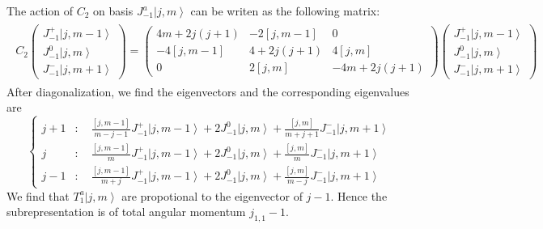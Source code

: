 \documentclass[10pt,a4paper]{article}
\numberwithin{equation}{section}
\newcommand{\ket}[1]{\left| #1 \right\rangle}
\begin{document}
The action of $C_{2}$ on basis $J^{a}_{-1} \ket{j,m}$ can be writen as the following matrix:
\begin{eqnarray}
    \begin{aligned}
        C_{2} 
    \begin{pmatrix}
    J^{+}_{-1} \ket{j,m-1}\\
    J^{0}_{-1} \ket{j,m}\\
    J^{-}_{-1} \ket{j,m+1}
    \end{pmatrix}
    = \begin{pmatrix}
        4m+2j(j+1) & -2 [j,m-1] & 0\\
        -4 [j,m-1] & 4 + 2j(j+1) & 4[j,m]\\
        0 & 2 [j,m] & -4m + 2j(j+1)
    \end{pmatrix}
    \begin{pmatrix}
        J^{+}_{-1} \ket{j,m-1}\\
        J^{0}_{-1} \ket{j,m}\\
        J^{-}_{-1} \ket{j,m+1}
    \end{pmatrix}
    \end{aligned}
\end{eqnarray}
After diagonalization, we find the eigenvectors and the corresponding eigenvalues are 
\begin{equation}
    \left\{
        \begin{aligned}
            j+1 &: \quad \frac{[j,m-1]}{m-j-1} J^{+}_{-1} \ket{j,m-1} + 2 J^{0}_{-1} \ket{j,m} + \frac{[j,m]}{m+j+1} J^{-}_{-1} \ket{j,m+1}\\
            j &: \quad \frac{[j,m-1]}{m} J^{+}_{-1} \ket{j,m-1} + 2 J^{0}_{-1} \ket{j,m} + \frac{[j,m]}{m} J^{-}_{-1} \ket{j,m+1}\\
            j-1 &: \quad \frac{[j,m-1]}{m+j} J^{+}_{-1} \ket{j,m-1} + 2 J^{0}_{-1} \ket{j,m} + \frac{[j,m]}{m-j} J^{-}_{-1} \ket{j,m+1}
        \end{aligned}
    \right.
\end{equation}
We find that $T^{a}_{1} \ket{j,m}$ are propotional to the eigenvector of $j-1$. Hence the subrepresentation is of total angular momentum $j_{1,1}-1$.
\end{document}
